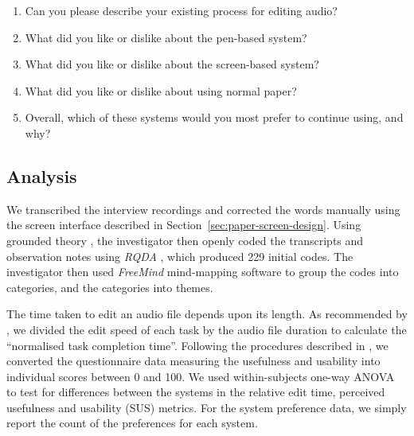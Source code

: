 

{\singlespacing
  \begin{enumerate}
    \item Can you please describe your existing process for editing audio?
    \item What did you like or dislike about the pen-based system?
    \item What did you like or dislike about the screen-based system?
    \item What did you like or dislike about using normal paper?
    \item Overall, which of these systems would you most prefer to continue using, and why?
  \end{enumerate}
}




\subsection{Analysis}

We transcribed the interview recordings and corrected the words manually using the screen interface described in
Section~\ref{sec:paper-screen-design}.  Using grounded theory \citep{Silverman2016}, the investigator then openly coded
the transcripts and observation notes using \textit{RQDA} \citep{RQDA}, which produced 229 initial codes. The
investigator then used \textit{FreeMind} mind-mapping software to group the codes into categories, and the categories
into themes.

The time taken to edit an audio file depends upon its length.  As recommended by \citet{Dewey2014}, we divided the edit
speed of each task by the audio file duration to calculate the ``normalised task completion time''.  Following the
procedures described in \citet{Davis1989,Brooke1996}, we converted the questionnaire data measuring the usefulness and
usability into individual scores between 0 and 100. We used within-subjects one-way ANOVA \citep{Rouanet1970} to test
for differences between the systems in the relative edit time, perceived usefulness and usability (SUS) metrics.  For
the system preference data, we simply report the count of the preferences for each system.

